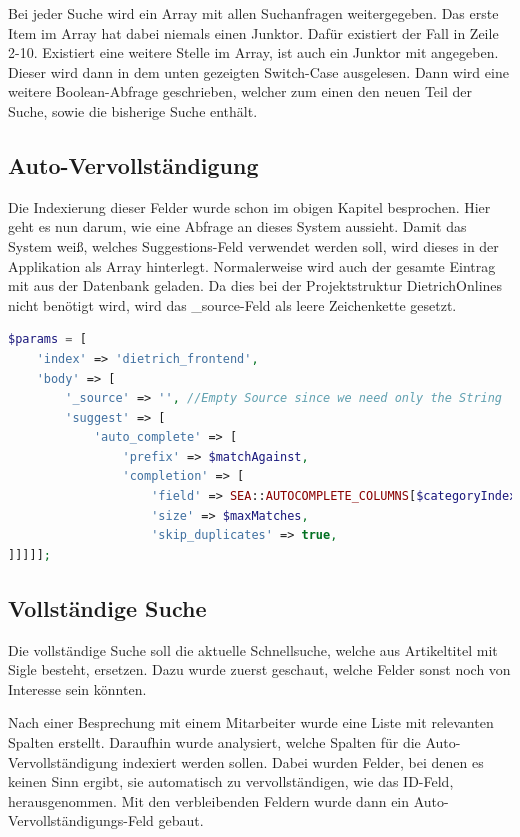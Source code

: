 Bei jeder Suche wird ein Array mit allen Suchanfragen weitergegeben. Das erste Item im Array hat dabei niemals einen Junktor. Dafür existiert der Fall in Zeile 2-10. Existiert eine weitere Stelle im Array, ist auch ein Junktor mit angegeben. Dieser wird dann in dem unten gezeigten Switch-Case ausgelesen. Dann wird eine weitere Boolean-Abfrage geschrieben, welcher zum einen den neuen Teil der Suche, sowie die bisherige Suche enthält.



\subsection{Auto-Vervollständigung}

Die Indexierung dieser Felder wurde schon im obigen Kapitel besprochen. Hier geht es nun darum, wie eine Abfrage an dieses System aussieht. Damit das System weiß, welches Suggestions-Feld verwendet werden soll, wird dieses in der Applikation als Array hinterlegt. Normalerweise wird auch der gesamte Eintrag mit aus der Datenbank geladen. Da dies bei der Projektstruktur DietrichOnlines nicht benötigt wird, wird das \_source-Feld als leere Zeichenkette gesetzt.


\begin{lstlisting}[language=PHP, frame=single, label={lst:autocompleParams}, caption=Auschnitt aus der Abfrage zur Auto-Vervollständigung,captionpos=b] 
$params = [
    'index' => 'dietrich_frontend',
    'body' => [
        '_source' => '', //Empty Source since we need only the String
        'suggest' => [
            'auto_complete' => [
                'prefix' => $matchAgainst,
                'completion' => [
                    'field' => SEA::AUTOCOMPLETE_COLUMNS[$categoryIndex],
                    'size' => $maxMatches,
                    'skip_duplicates' => true,
]]]]];
\end{lstlisting}

\subsection{Vollständige Suche}

Die vollständige Suche soll die aktuelle Schnellsuche, welche aus Artikeltitel mit Sigle besteht, ersetzen. Dazu wurde zuerst geschaut, welche Felder sonst noch von Interesse sein könnten. 

Nach einer Besprechung mit einem Mitarbeiter wurde eine Liste mit relevanten Spalten erstellt. Daraufhin wurde analysiert, welche Spalten für die Auto-Vervollständigung indexiert werden sollen. Dabei wurden Felder, bei denen es keinen Sinn ergibt, sie automatisch zu vervollständigen, wie das ID-Feld, herausgenommen. Mit den verbleibenden Feldern wurde dann ein Auto-Vervollständigungs-Feld gebaut.

